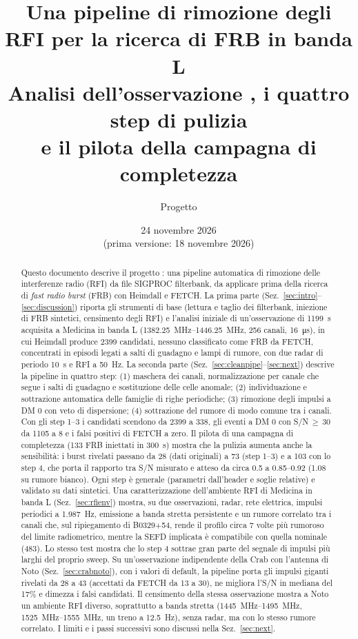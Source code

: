 \documentclass[11pt,a4paper]{article}
\title{\textbf{Una pipeline di rimozione degli RFI per la ricerca di FRB in banda L}\\[4pt]
\large Analisi dell'osservazione \file{ag278m_mc_no0004_processed.fil}, i quattro step di pulizia\\
e il pilota della campagna di completezza}
\author{Progetto \file{frb-rfi-clean}}
\date{24 novembre 2026 \\ \small (prima versione: 18 novembre 2026)}
\DeclareRobustCommand{\file}[1]{\texttt{\detokenize{#1}}}
\begin{document}
\maketitle

\begin{abstract}
\noindent
Questo documento descrive il progetto \file{frb-rfi-clean}: una pipeline automatica di rimozione delle interferenze
radio (RFI) da file SIGPROC filterbank, da applicare prima della ricerca di \emph{fast radio burst} (FRB) con Heimdall
e FETCH. La prima parte (Sez.~\ref{sec:intro}--\ref{sec:discussion}) riporta gli strumenti di base (lettura e taglio
dei filterbank, iniezione di FRB sintetici, censimento degli RFI) e l'analisi iniziale di un'osservazione di
\SI{1199}{\second} acquisita a Medicina in banda L (\SIrange{1382.25}{1446.25}{\mega\hertz}, 256 canali,
\SI{16}{\micro\second}), in cui Heimdall produce 2399 candidati, nessuno classificato come FRB da FETCH, concentrati in
episodi legati a salti di guadagno e lampi di rumore, con due radar di periodo \SI{10}{\second} e RFI a \SI{50}{\hertz}.
La seconda parte (Sez.~\ref{sec:cleanpipe}--\ref{sec:next}) descrive la pipeline in quattro step:
(1) maschera dei canali, normalizzazione per canale che segue i salti di guadagno e sostituzione delle celle anomale;
(2) individuazione e sottrazione automatica delle famiglie di righe periodiche;
(3) rimozione degli impulsi a DM 0 con veto di dispersione;
(4) sottrazione del rumore di modo comune tra i canali.
Con gli step 1--3 i candidati scendono da 2399 a 338, gli eventi a DM 0 con S/N\,$\geq$\,30 da 1105 a 8 e i falsi
positivi di FETCH a zero. Il pilota di una campagna di completezza (133 FRB iniettati in \SI{300}{\second}) mostra che
la pulizia aumenta anche la sensibilità: i burst rivelati passano da 28 (dati originali) a 73 (step 1--3) e a 103 con lo
step 4, che porta il rapporto tra S/N misurato e atteso da circa 0.5 a 0.85--0.92 (1.08 su rumore bianco).
Ogni step è generale (parametri dall'header e soglie relative) e validato su dati sintetici. Una caratterizzazione
dell'ambiente RFI di Medicina in banda L (Sez.~\ref{sec:rfienv}) mostra, su due osservazioni, radar, rete elettrica,
impulsi periodici a \SI{1.987}{\hertz}, emissione a banda stretta persistente e un rumore correlato tra i canali che,
sul ripiegamento di B0329+54, rende il profilo circa 7 volte più rumoroso del limite radiometrico, mentre la SEFD
implicata è compatibile con quella nominale (\SI{483}{\jansky}). Lo stesso test mostra che lo step 4 sottrae gran parte
del segnale di impulsi più larghi del proprio sweep. Su un'osservazione indipendente della Crab con l'antenna di Noto
(Sez.~\ref{sec:crabnoto}), con i valori di default, la pipeline porta gli impulsi giganti rivelati da 28 a 43 (accettati
da FETCH da 13 a 30), ne migliora l'S/N in mediana del 17\% e dimezza i falsi candidati. Il censimento della stessa osservazione mostra
a Noto un ambiente RFI diverso, soprattutto a banda stretta (\SIrange{1445}{1495}{\mega\hertz},
\SIrange{1525}{1555}{\mega\hertz}, un treno a \SI{12.5}{\hertz}), senza radar, ma con lo stesso rumore correlato. I limiti e i passi successivi sono discussi nella
Sez.~\ref{sec:next}.
\end{abstract}
\end{document}
